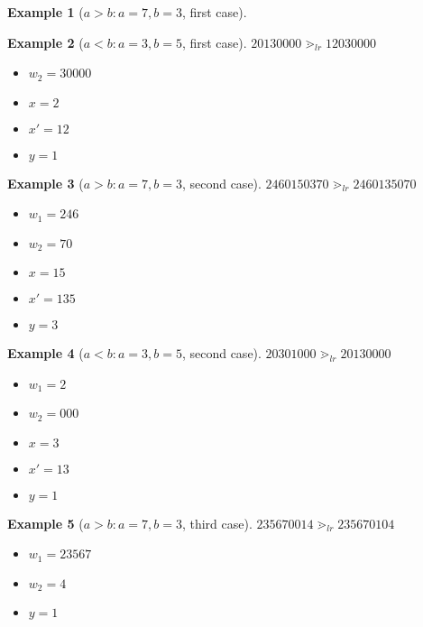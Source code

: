 \documentclass[12pt]{report}
\newtheorem*{example}{Example}
\begin{document}
\begin{example}[$a > b : a = 7, b = 3$, first case]
\begin{center}
    \end{center}
\end{example}

\begin{example}[$a < b : a = 3, b = 5$, first case]
    $20130000 \gtrdot_{lr} 12030000$
    \begin{itemize}
        \item $w_2 = 30000$
        \item $x = 2$
        \item $x' = 12$
        \item $y = 1$
    \end{itemize}
\end{example}

\begin{example}[$a > b : a = 7, b = 3$, second case]
    $2460150370 \gtrdot_{lr} 2460135070$
    \begin{itemize}
        \item $w_1 = 246$
        \item $w_2 = 70$
        \item $x = 15$
        \item $x' = 135$
        \item $y = 3$
    \end{itemize}
\end{example}

\begin{example}[$a < b : a = 3, b = 5$, second case]
    $20301000 \gtrdot_{lr} 20130000 $
    \begin{itemize}
        \item $w_1 = 2$
        \item $w_2 = 000$
        \item $x = 3$
        \item $x' = 13$
        \item $y = 1$
    \end{itemize}
\end{example}

\begin{example}[$a > b : a = 7, b = 3$, third case]
    $235670014 \gtrdot_{lr} 235670104$
    \begin{itemize}
        \item $w_1 = 23567$
        \item $w_2 = 4$
        \item $y = 1$
    \end{itemize}
\end{example}
\end{document}
